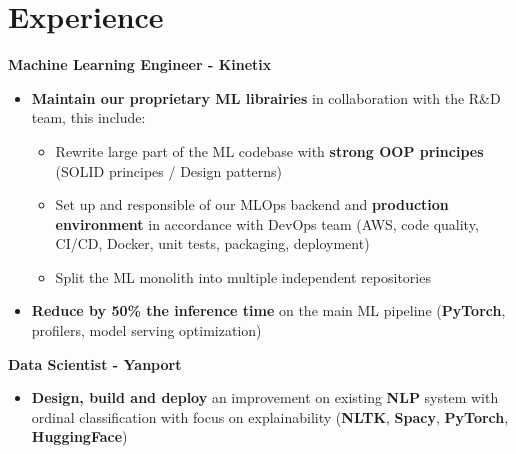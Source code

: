 \documentclass[a4paper,10pt]{article}
\begin{document}
\begin{adjustbox}{valign=t}
    \begin{minipage}{0.6\textwidth}
        \vspace{1cm}
        \section*{Experience}
        \vspace{-.3cm}
        \begin{description}
            \raggedright
            \item[\normalfont \textcolor{ColorOne}{Since Oct. 2022}]
                \textbf{Machine Learning Engineer - Kinetix}\\
                \small
                \begin{itemize}[topsep=0pt]
                    \item \textbf{Maintain our proprietary ML librairies} in collaboration with the R\&D team, this include:
                    \begin{itemize}[topsep=0pt]
                        \item Rewrite large part of the ML codebase with \textbf{strong OOP principes} (SOLID principes / Design patterns)
                        \item Set up and responsible of our MLOps backend and \textbf{production environment} in accordance with DevOps team (AWS, code quality, CI/CD, Docker, unit tests, packaging, deployment)
                        \item Split the ML monolith into multiple independent repositories
                    \end{itemize}
                    \item \textbf{Reduce by 50\% the inference time} on the main ML pipeline (\textbf{PyTorch}, profilers, model serving optimization)
                \end{itemize}
                \normalsize
            \item[\normalfont \textcolor{ColorOne}{Sep. 2021 -- Sep. 2022}]
                \textbf{Data Scientist - Yanport}\\
                \small
                \begin{itemize}[topsep=0pt]
                    \item \textbf{Design, build and deploy} an improvement on existing \textbf{NLP} system with ordinal classification with focus on explainability (\textbf{NLTK}, \textbf{Spacy}, \textbf{PyTorch}, \textbf{HuggingFace})

\end{itemize}
\end{description}
\end{minipage}
\end{adjustbox}
\end{document}
